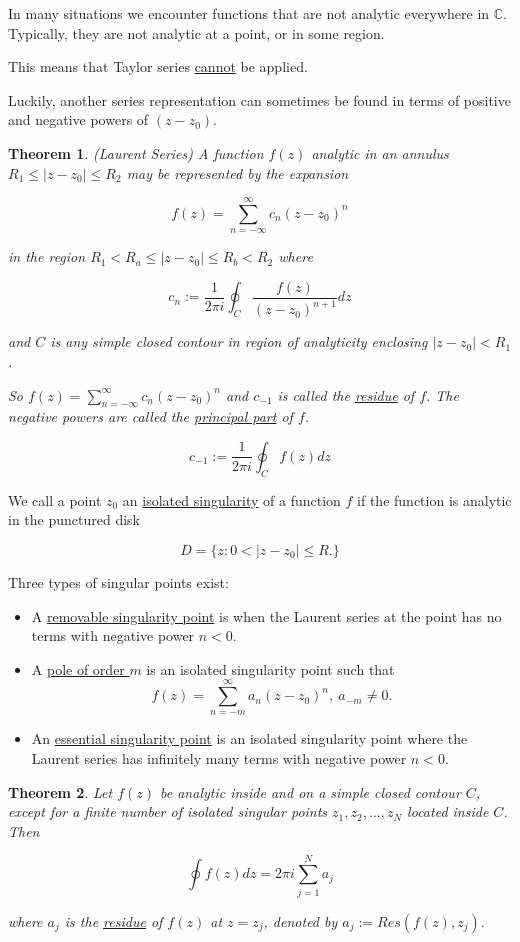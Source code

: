 \documentclass[twoside]{article}
\newcounter{lecnum}
\newtheorem{theorem}{Theorem}[lecnum]
\begin{document}
In many situations we encounter functions that are not analytic everywhere in $\mathbb{C}$. Typically, they are not analytic at a point, or in some region.

This means that Taylor series \underline{cannot} be applied.

Luckily, another series representation can sometimes be found in terms of positive and negative powers of $(z-z_0)$.

\begin{theorem}
	(Laurent Series) A function $f(z)$ analytic in an annulus $R_1\leq \lvert z-z_0\rvert \leq R_2$ may be represented by the expansion
	
	$$f(z)=\sum^\infty_{n=-\infty}c_n(z-z_0)^n$$
	
	in the region $R_1<R_a\leq \lvert z- z_0\rvert \leq R_b < R_2$ where 
	
	$$c_n:=\frac{1}{2\pi i}\oint_C\frac{f(z)}{(z-z_0)^{n+1}}dz$$
	
	and $C$ is any simple closed contour in region of analyticity enclosing $\lvert z-z_0\rvert < R_1$.
	
	So $f(z)=\sum^\infty_{n=-\infty}c_n(z-z_0)^n$ and $c_{-1}$ is called the \underline{residue} of $f$. The negative powers are called the \underline{principal part} of $f$.
	
	$$c_{-1}:=\frac{1}{2\pi i}\oint_C f(z)dz$$
\end{theorem}

We call a point $z_0$ an \underline{isolated singularity} of a function $f$ if the function is analytic in the punctured disk

$$D=\{z:0<\lvert z-z_0\rvert\leq R.\}$$

Three types of singular points exist:

\begin{itemize}
	\item A \underline{removable singularity point} is when the Laurent series at the point has no terms with negative power $n<0$.
	\item A \underline{pole of order $m$} is an isolated singularity point such that$$f(z)=\sum^\infty_{n=-m}a_n(z-z_0)^n,\ a_{-m}\not=0.$$
	\item An \underline{essential singularity point} is an isolated singularity point where the Laurent series has infinitely many terms with negative power $n<0$.
\end{itemize}

\begin{theorem}
	Let $f(z)$ be analytic inside and on a simple closed contour $C$, except for a finite number of isolated singular points $z_1,z_2,\dots, z_N$ located inside $C$. Then
	
	$$\oint f(z)dz=2\pi i\sum^N_{j=1}a_j$$
	
	where $a_j$ is the \underline{residue} of $f(z)$ at $z=z_j$, denoted by $a_j:=Res(f(z), z_j).$
\end{theorem}

\end{document}

